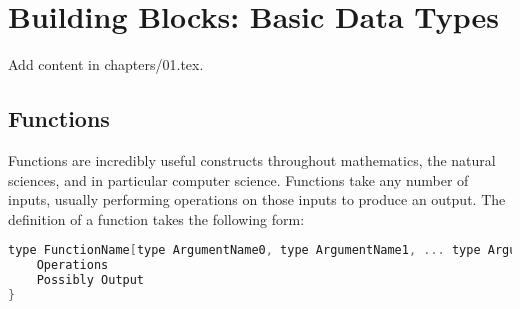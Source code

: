 \chapter{Building Blocks: Basic Data Types}
\lstset{style=BrenMat}

Add content in chapters/01.tex.

\section{Functions}
Functions are incredibly useful constructs throughout mathematics, the natural sciences, and in particular
computer science. Functions take any number of inputs, usually performing operations on those inputs to
produce an output. The definition of a function takes the following form:
\begin{center}
\begin{lstlisting}[language=C]
type FunctionName[type ArgumentName0, type ArgumentName1, ... type ArgumentNameN]{
	Operations
	Possibly Output
}
\end{lstlisting}
\end{center}

